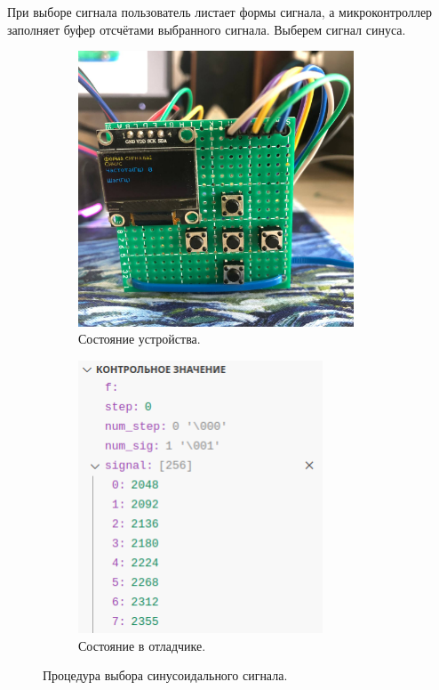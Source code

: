 	При выборе сигнала пользователь листает формы сигнала, а микроконтроллер заполняет буфер отсчётами выбранного сигнала. Выберем сигнал синуса.
	\begin{figure}[H]\captionsetup[subfigure]{font=normalsize}
     \begin{subfigure}[H]{0.5\textwidth}
         \centering
         \includegraphics[width=0.9\textwidth]{../image/test1_u_s.jpg}
         \caption{Состояние устройства.}
     \end{subfigure}
     \hfill
     \begin{subfigure}[H]{0.5\textwidth}
         \centering
         \includegraphics[width=0.8\textwidth]{../image/test1_o_s.png}
         \caption{Состояние в отладчике.}
     \end{subfigure}
        \caption{Процедура выбора синусоидального сигнала.}
	\end{figure}
	

